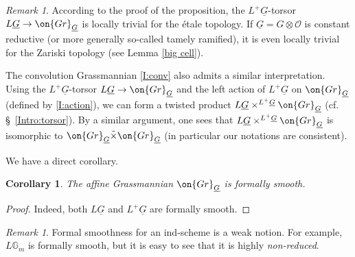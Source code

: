 \documentclass[]{pcmi}
\theoremstyle{plain}
\newtheorem{cor}[equation]{Corollary}
\theoremstyle{remark}
\newtheorem{rmk}[equation]{Remark}
\theoremstyle{definition}
\newcommand{\bG}{{\mathbb G}}
\newcommand{\mO}{{\mathcal O}}
\newcommand{\Gr}{{\on{Gr}}}
\begin{document}
\begin{rmk}
According to the proof of the proposition, the $L^+\underline G$-torsor $L\underline G\to \Gr_{\underline G}$ is locally trivial for the \'etale topology.
If $\underline{G}=G\otimes \mO$ is constant reductive (or more generally so-called tamely ramified), it is even locally trivial for the Zariski topology (see Lemma \ref{big cell}). 
\end{rmk}


The convolution Grassmannian \eqref{I:conv} also admits a similar interpretation. Using the $L^+\underline G$-torsor $L\underline G\to \Gr_{\underline G}$  and the left action of $L^+\underline G$ on $\Gr_{\underline G}$ (defined by \eqref{I:action}), we can form a twisted product   $L\underline G\times^{L^+ \underline G}\Gr_{\underline G}$ (cf. \S\ \ref{Intro:torsor}). By a similar argument, one sees that $L\underline G\times^{L^+ \underline G}\Gr_{\underline G}$ is isomorphic to $\Gr_{\underline G}\tilde\times\Gr_{\underline G}$ (in particular our notations are consistent).






We have a direct corollary.
\begin{cor}The affine Grassmannian $\Gr_{\underline G}$ is formally smooth.
\end{cor}
\begin{proof}Indeed, both $L\underline G$ and $L^+\underline G$ are formally smooth.
\end{proof}
\begin{rmk}\label{formal smoothness}
Formal smoothness for an ind-scheme is a weak notion. For example, $L\bG_m$ is formally smooth, but it is easy to see that it is highly \emph{non-reduced}.
\end{rmk}
 
\end{document}
